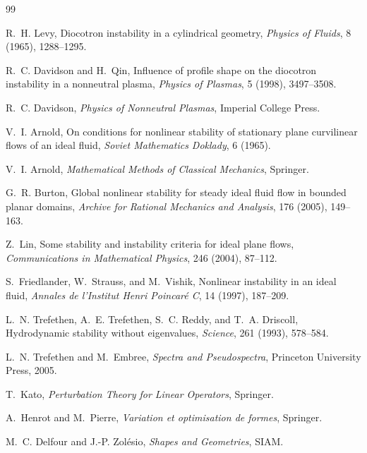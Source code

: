 \documentclass[11pt,a4paper]{article}
\begin{document}
\begin{thebibliography}{99}

R.~H. Levy,
\newblock Diocotron instability in a cylindrical geometry,
\newblock \emph{Physics of Fluids}, 8 (1965), 1288--1295.

R.~C. Davidson and H.~Qin,
\newblock Influence of profile shape on the diocotron instability in a nonneutral plasma,
\newblock \emph{Physics of Plasmas}, 5 (1998), 3497--3508.

R.~C. Davidson,
\newblock \emph{Physics of Nonneutral Plasmas},
\newblock Imperial College Press.

V.~I. Arnold,
\newblock On conditions for nonlinear stability of stationary plane curvilinear flows of an ideal fluid,
\newblock \emph{Soviet Mathematics Doklady}, 6 (1965).

V.~I. Arnold,
\newblock \emph{Mathematical Methods of Classical Mechanics},
\newblock Springer.

G.~R. Burton,
\newblock Global nonlinear stability for steady ideal fluid flow in bounded planar domains,
\newblock \emph{Archive for Rational Mechanics and Analysis}, 176 (2005), 149--163.

Z.~Lin,
\newblock Some stability and instability criteria for ideal plane flows,
\newblock \emph{Communications in Mathematical Physics}, 246 (2004), 87--112.

S.~Friedlander, W.~Strauss, and M.~Vishik,
\newblock Nonlinear instability in an ideal fluid,
\newblock \emph{Annales de l'Institut Henri Poincar\'e C}, 14 (1997), 187--209.

L.~N. Trefethen, A.~E. Trefethen, S.~C. Reddy, and T.~A. Driscoll,
\newblock Hydrodynamic stability without eigenvalues,
\newblock \emph{Science}, 261 (1993), 578--584.

L.~N. Trefethen and M.~Embree,
\newblock \emph{Spectra and Pseudospectra},
\newblock Princeton University Press, 2005.

T.~Kato,
\newblock \emph{Perturbation Theory for Linear Operators},
\newblock Springer.

A.~Henrot and M.~Pierre,
\newblock \emph{Variation et optimisation de formes},
\newblock Springer.

M.~C. Delfour and J.-P. Zol\'esio,
\newblock \emph{Shapes and Geometries},
\newblock SIAM.


\end{thebibliography}
\end{document}

